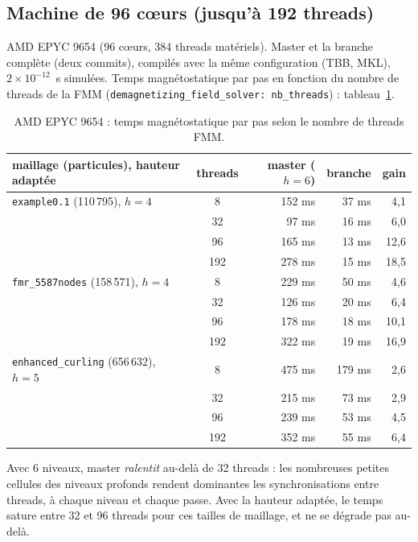 \documentclass[11pt,a4paper]{article}
\newcommand{\code}[1]{\texttt{#1}}
\begin{document}
\subsection{Machine de 96 cœurs (jusqu'à 192 threads)}

AMD EPYC 9654 (96 cœurs, 384 threads matériels). Master et la branche complète (deux commits),
compilés avec la même configuration (TBB, MKL), $2\times 10^{-12}$~s simulées. Temps
magnétostatique par pas en fonction du nombre de threads de la FMM
(\code{demagnetizing\_field\_solver: nb\_threads}) : tableau~\ref{tab:rigel}.

\begin{table}[htbp]
\centering
\caption{AMD EPYC 9654 : temps magnétostatique par pas selon le nombre de threads FMM.}
\label{tab:rigel}
\begin{tabular}{lcrrr}
\toprule
maillage (particules), hauteur adaptée & threads & master ($h = 6$) & branche & gain \\
\midrule
\code{example0.1} (110\,795), $h = 4$ & 8   & 152 ms & 37 ms & 4,1 \\
                                       & 32  & 97 ms  & 16 ms & 6,0 \\
                                       & 96  & 165 ms & 13 ms & 12,6 \\
                                       & 192 & 278 ms & 15 ms & 18,5 \\
\midrule
\code{fmr\_5587nodes} (158\,571), $h = 4$ & 8   & 229 ms & 50 ms & 4,6 \\
                                          & 32  & 126 ms & 20 ms & 6,4 \\
                                          & 96  & 178 ms & 18 ms & 10,1 \\
                                          & 192 & 322 ms & 19 ms & 16,9 \\
\midrule
\code{enhanced\_curling} (656\,632), $h = 5$ & 8   & 475 ms & 179 ms & 2,6 \\
                                             & 32  & 215 ms & 73 ms  & 2,9 \\
                                             & 96  & 239 ms & 53 ms  & 4,5 \\
                                             & 192 & 352 ms & 55 ms  & 6,4 \\
\bottomrule
\end{tabular}
\end{table}

Avec 6 niveaux, master \emph{ralentit} au-delà de 32 threads : les nombreuses petites cellules
des niveaux profonds rendent dominantes les synchronisations entre threads, à chaque niveau et
chaque passe. Avec la hauteur adaptée, le temps sature entre 32 et 96 threads pour ces tailles de
maillage, et ne se dégrade pas au-delà.
\end{document}
